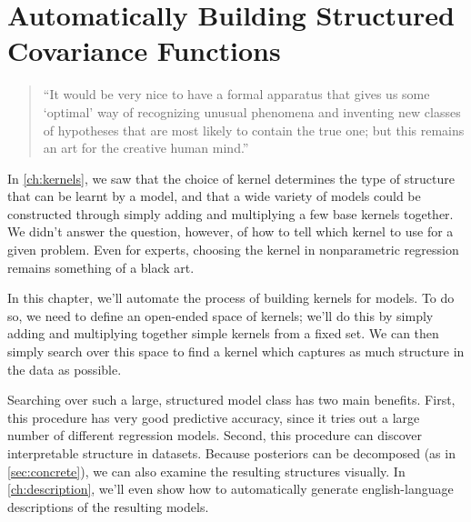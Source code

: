 
\inbpdocument


\chapter{Automatically Building Structured Covariance Functions}
\label{ch:grammar}

\begin{quotation}
``It would be very nice to have a formal apparatus that gives us some `optimal' way of recognizing unusual phenomena and inventing new classes of hypotheses that are most likely to contain the true one; but this remains an art for the creative human mind.''

\hspace*{\fill}
\end{quotation}


In \cref{ch:kernels}, we saw that the choice of kernel determines the type of structure that can be learnt by a \gp{} model, and that a wide variety of models could be constructed through simply adding and multiplying a few base kernels together.
We didn't answer the question, however, of how to tell which kernel to use for a given problem.
Even for experts, choosing the kernel in nonparametric regression remains something of a black art.

In this chapter, we'll automate the process of building kernels for \gp{} models.
To do so, we need to define an open-ended space of kernels; we'll do this by simply adding and multiplying together simple kernels from a fixed set.
We can then simply search over this space to find a kernel which captures as much structure in the data as possible.

Searching over such a large, structured model class has two main benefits.
First, this procedure has very good predictive accuracy, since it tries out a large number of different regression models.
Second, this procedure can discover interpretable structure in datasets.
Because \gp{} posteriors can be decomposed (as in \cref{sec:concrete}), we can also examine the resulting structures visually.
In \cref{ch:description}, we'll even show how to automatically generate english-language descriptions of the resulting models.

